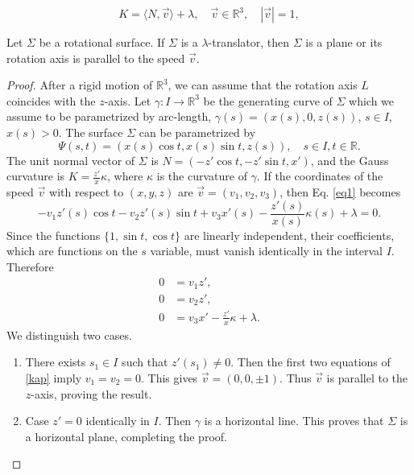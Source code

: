 \documentclass[10pt,a4paper]{amsart}
\def\r{\mathbb R}
\begin{document}
\begin{equation}\label{eq1}
K=\langle N, \vec{v} \rangle +\lambda, \quad \vec{v} \in \r^3, \quad |\vec{v}|=1, 
\end{equation}

\begin{proposition} \label{pr-ax}
Let $\Sigma$ be a   rotational surface. If $\Sigma$ is a $\lambda$-translator, then $\Sigma$ is a plane or its rotation axis is parallel to the speed $\vec{v}$.
\end{proposition}

\begin{proof}
 After a rigid motion of $\r^3$, we   can assume that the rotation axis $L$ coincides with the $z$-axis. Let $\gamma\colon I\to\r^3$ be the generating curve of $\Sigma$ which we assume to be parametrized by arc-length,  $\gamma(s)=(x(s),0,z(s))$, $s\in I$, $x(s)>0$. The surface $\Sigma$ can be parametrized by  
\begin{equation}\label{para}
\Psi(s,t)=(x(s)\cos t,x(s)\sin t,z(s)), \quad s\in I, t\in \r.
\end{equation}
 The unit normal vector of $\Sigma$ is $N=(-z'\cos t,-z'\sin t,x')$, and the Gauss curvature   is $K=\frac{z'}{x}\kappa$, where $\kappa$ is the curvature of $\gamma$. If the coordinates of  the speed $\vec{v}$ with respect to $(x,y,z)$ are $\vec{v}=(v_1,v_2,v_3)$, then Eq. \eqref{eq1}   becomes
\begin{equation*}
-v_1z'(s)\cos t-v_2z'(s)\sin t+v_3x'(s)-\frac{z'(s)}{x(s)}\kappa(s)+\lambda=0.
\end{equation*}
Since the functions $\{1,\sin t,\cos t\}$ are linearly independent, their coefficients, which are functions on the $s$ variable, must vanish identically in the interval $I$. Therefore  
\begin{equation}
\begin{split}
0&=v_1z', \\
0&=v_2z', \\
0&=v_3x'-\frac{z'}{x}\kappa+\lambda.
\end{split}  \label{kap}
\end{equation}
We distinguish two cases.
\begin{enumerate}
\item There exists $s_1\in I$ such that $z'(s_1)\not=0$. Then the first two equations of \eqref{kap} imply $v_1=v_2=0$. This gives $\vec{v}=(0,0,\pm 1)$. Thus $\vec{v}$ is parallel to the $z$-axis,  proving the result.
\item Case $z'=0$ identically in $I$. Then $\gamma$ is a horizontal line. This proves that $\Sigma$ is a horizontal plane, completing the proof.  
\end{enumerate}
\end{proof}
\end{document}
